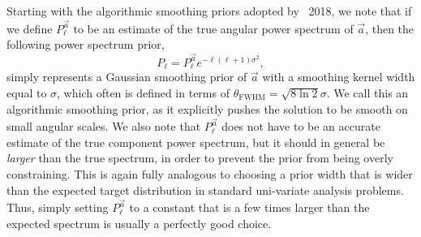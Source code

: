\documentclass[twocolumn]{aa}
\renewcommand{\a}[0]{\vec{a}}
\begin{document}
Starting with the algorithmic smoothing priors adopted by
\Planck\ 2018, we note that if we define $P_{\ell}^{\a}$ to be an
estimate of the true angular power spectrum of $\a$, then the
following power spectrum prior, 
\begin{equation}
  P_{\ell} = P^{\a}_{\ell}e^{-\ell(\ell+1)\sigma^2},
  \label{eq:gauss_smooth_prior}
\end{equation}
simply represents a Gaussian smoothing prior of $\a$ with a smoothing
kernel width equal to $\sigma$, which often is defined in terms of
$\theta_\mathrm{FWHM}=\sqrt{8\ln 2}\sigma$. We call this an
algorithmic smoothing prior, as it explicitly pushes the solution to
be smooth on small angular scales. We also note that $P_{\ell}^{\a}$
does not have to be an accurate estimate of the true component power
spectrum, but it should in general be \emph{larger} than the true
spectrum, in order to prevent the prior from being overly
constraining. This is again fully analogous to choosing a prior width
that is wider than the expected target distribution in standard
uni-variate analysis problems. Thus, simply setting $P_{\ell}^{\a}$ to
a constant that is a few times larger than the expected spectrum is
usually a perfectly good choice.
\end{document}
